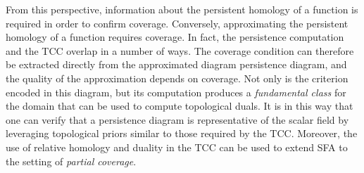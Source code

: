 From this perspective, information about the persistent homology of a function is required in order to confirm coverage.
Conversely, approximating the persistent homology of a function requires coverage.
In fact, the persistence computation and the TCC overlap in a number of ways.
The coverage condition can therefore be extracted directly from the approximated diagram persistence diagram, and the quality of the approximation depends on coverage.
Not only is the criterion encoded in this diagram, but its computation produces a \emph{fundamental class} for the domain that can be used to compute topological duals.
It is in this way that one can verify that a persistence diagram is representative of the scalar field by leveraging topological priors similar to those required by the TCC.
Moreover, the use of relative homology and duality in the TCC can be used to extend SFA to the setting of \emph{partial coverage}.
